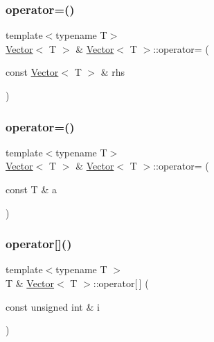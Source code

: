\mbox{\label{classVector_aa44e8e04a723f2c0bd9382a3bfa46e7c}} 
\subsubsection{\texorpdfstring{operator=()}{operator=()}\hspace{0.1cm}{\footnotesize\ttfamily [1/2]}}
{\footnotesize\ttfamily template$<$typename T$>$ \\
\mbox{\hyperlink{classVector}{Vector}}$<$ T $>$ \& \mbox{\hyperlink{classVector}{Vector}}$<$ T $>$\+::operator= (\begin{DoxyParamCaption}\item[{const \mbox{\hyperlink{classVector}{Vector}}$<$ T $>$ \&}]{rhs }\end{DoxyParamCaption})\hspace{0.3cm}{\ttfamily [inline]}}

\mbox{\label{classVector_a6bbf5f187006ef2567fdcebd37ebfa97}} 
\subsubsection{\texorpdfstring{operator=()}{operator=()}\hspace{0.1cm}{\footnotesize\ttfamily [2/2]}}
{\footnotesize\ttfamily template$<$typename T$>$ \\
\mbox{\hyperlink{classVector}{Vector}}$<$ T $>$ \& \mbox{\hyperlink{classVector}{Vector}}$<$ T $>$\+::operator= (\begin{DoxyParamCaption}\item[{const T \&}]{a }\end{DoxyParamCaption})\hspace{0.3cm}{\ttfamily [inline]}}

\mbox{\label{classVector_aa07a0c8ca467e2ce190afc26054cf422}} 
\subsubsection{\texorpdfstring{operator[]()}{operator[]()}\hspace{0.1cm}{\footnotesize\ttfamily [1/2]}}
{\footnotesize\ttfamily template$<$typename T $>$ \\
T \& \mbox{\hyperlink{classVector}{Vector}}$<$ T $>$\+::operator\mbox{[}$\,$\mbox{]} (\begin{DoxyParamCaption}\item[{const unsigned int \&}]{i }\end{DoxyParamCaption})\hspace{0.3cm}{\ttfamily [inline]}}

